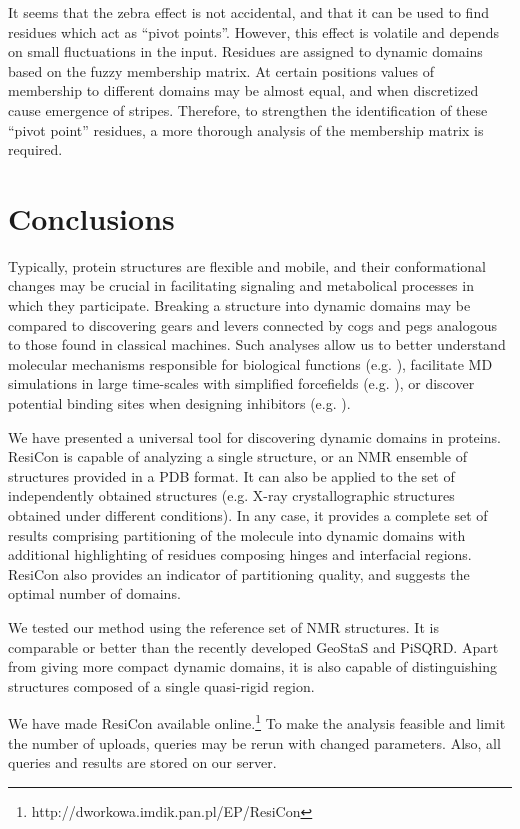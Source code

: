 \documentclass[a4paper,11pt,twoside]{book}%
\begin{document}
It seems that the zebra effect is not accidental, and that it can be used to find residues which act as ``pivot points''. 
However, this effect is volatile and depends on small fluctuations in the input.
Residues are assigned to dynamic domains based on the fuzzy membership matrix.
At certain positions values of membership to different domains may be almost equal, and when discretized cause emergence of stripes.
Therefore, to strengthen the identification of these ``pivot point'' residues, a more thorough analysis of the membership matrix is required.

\section{Conclusions}
Typically, protein structures are flexible and mobile, and their conformational changes may be crucial in facilitating signaling and metabolical processes in which they participate.
Breaking a structure into dynamic domains may be compared to discovering gears and levers connected by cogs and pegs analogous to those found in classical machines.
Such analyses allow us to better understand molecular mechanisms responsible for biological functions (e.g. \cite{taylor2013classification}), facilitate MD simulations in large time-scales with simplified forcefields (e.g. \cite{sinitskiy2012optimal}), or discover potential binding sites when designing inhibitors (e.g. \cite{zhang2009defining}).

We have presented a universal tool for discovering dynamic domains in proteins.
ResiCon is capable of analyzing a single structure, or an NMR ensemble of structures provided in a PDB format.
It can also be applied to the set of independently obtained structures (e.g. X-ray crystallographic structures obtained under different conditions).
In any case, it provides a complete set of results comprising partitioning of the molecule into dynamic domains with additional highlighting of residues composing hinges and interfacial regions.
ResiCon also provides an indicator of partitioning quality, and suggests the optimal number of domains.

We tested our method using the reference set of NMR structures.
It is comparable or better than the recently developed GeoStaS and PiSQRD.
Apart from giving more compact dynamic domains, it is also capable of distinguishing structures composed of a single quasi-rigid region.

We have made ResiCon available online.\footnote{http://dworkowa.imdik.pan.pl/EP/ResiCon}
To make the analysis feasible and limit the number of uploads, queries may be rerun with changed parameters.
Also, all queries and results are stored on our server.
\end{document}
